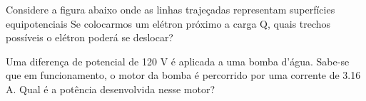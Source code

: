\documentclass[12pt, addpoints]{exam}
\begin{document}
\begin{questions}
\begin{multicols*}{2}
\begin{oneparchoices}
\end{oneparchoices}
\question[20] Considere a figura abaixo onde as linhas trajeçadas representam superfícies equipotenciais Se colocarmos um elétron próximo a carga Q, quais trechos possíveis o elétron poderá se deslocar?
        
        \begin{center}
            \begin{minipage}[c]{0.5\linewidth}
            \end{minipage}
        \end{center}
        
        

\begin{oneparchoices}
\end{oneparchoices}
\question[20] Uma diferença de potencial de 120 V é aplicada a uma bomba d’água. Sabe-se que em funcionamento, o motor da bomba é percorrido por uma corrente de    3.16 A. Qual é a potência desenvolvida nesse motor?


\end{multicols*}
\end{questions}
\end{document}
